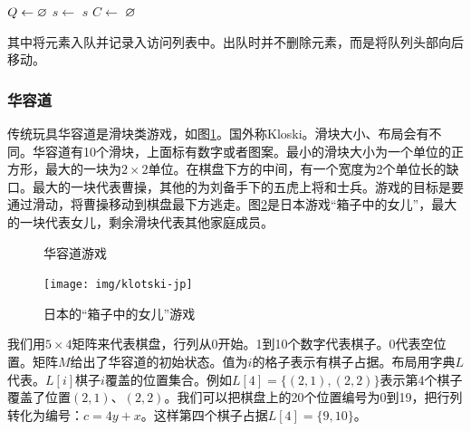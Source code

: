 \documentclass[b5paper]{ctexart}
\begin{document}
\begin{algorithmic}[1]
  \State $Q \gets \varnothing$
  \State {}
    \State $s \gets$ 
      \State \Return $s$
    \Else
      \State $C \gets$ 
          \State {}
        \EndIf
      \EndFor
    \EndIf
  \EndWhile
  \State \Return $\varnothing$
\EndFunction
\end{algorithmic}

其中将元素入队并记录入访问列表中。出队时并不删除元素，而是将队列头部向后移动。

\subsubsection{华容道}

传统玩具华容道是滑块类游戏，如图\ref{fig:klotski-cn}。国外称Kloski。滑块大小、布局会有不同。华容道有10个滑块，上面标有数字或者图案。最小的滑块大小为一个单位的正方形，最大的一块为$2 \times 2$单位。在棋盘下方的中间，有一个宽度为2个单位长的缺口。最大的一块代表曹操，其他的为刘备手下的五虎上将和士兵。游戏的目标是要通过滑动，将曹操移动到棋盘最下方逃走。图\ref{fig:klotski-jp}是日本游戏“箱子中的女儿”，最大的一块代表女儿，剩余滑块代表其他家庭成员。

\begin{figure}[htbp]
 \centering
  \hspace{.01\textwidth}
 \caption{华容道游戏}
 \label{fig:klotski-cn}
\end{figure}

\begin{figure}[htbp]
 \centering
 \texttt{[image: img/klotski-jp]}
 \caption{日本的“箱子中的女儿”游戏}
 \label{fig:klotski-jp}
\end{figure}

我们用$5 \times 4$矩阵来代表棋盘，行列从0开始。1到10个数字代表棋子。0代表空位置。矩阵$M$给出了华容道的初始状态。值为$i$的格子表示有棋子占据。布局用字典$L$代表。$L[i]$棋子$i$覆盖的位置集合。例如$L[4] = \{(2, 1), (2, 2)\}$表示第4个棋子覆盖了位置$(2, 1)$、$(2, 2)$。我们可以把棋盘上的20个位置编号为0到19，把行列转化为编号：$c = 4y + x$。这样第四个棋子占据$L[4] = \{9, 10\}$。
\end{document}
